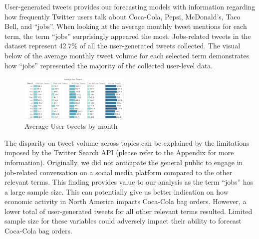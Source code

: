 \documentclass[12pt,oneside]{chicagocapstone}
\begin{document}
User-generated tweets provides our forecasting models with information regarding how frequently Twitter users talk about Coca-Cola, Pepsi, McDonald's, Taco Bell, and ``jobs''. When looking at the average monthly tweet mentions for each term, the term ``jobs'' surprisingly appeared the most. Jobs-related tweets in the dataset represent 42.7\% of all the user-generated tweets collected. The visual below of the average monthly tweet volume for each selected term demonstrates how ``jobs'' represented the majority of the collected user-level data.
\begin{figure}

{\centering \includegraphics[width=200px,angle = 0, scale=2.1]{figure/AveUserTweets} 

}

\caption{Average User tweets by month}\label{fig:AveUserTweet}
\end{figure}
The disparity on tweet volume across topics can be explained by the limitations imposed by the Twitter Search API (please refer to the Appendix for more information). Originally, we did not anticipate the general public to engage in job-related conversation on a social media platform compared to the other relevant terms. This finding provides value to our analysis as the term ``jobs'' has a large sample size. This can potentially give us better indication on how economic activity in North America impacts Coca-Cola bag orders. However, a lower total of user-generated tweets for all other relevant terms resulted. Limited sample size for these variables could adversely impact their ability to forecast Coca-Cola bag orders.
\end{document}
